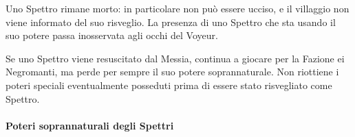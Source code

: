 \documentclass[a4paper,10pt]{article}
\begin{document}
\begin{itemize}
 Uno Spettro rimane morto: in particolare non può essere ucciso, e il villaggio non viene informato del suo risveglio.
 La presenza di uno Spettro che sta usando il suo potere passa inosservata agli occhi del Voyeur.
 
 Se uno Spettro viene resuscitato dal Messia, continua a giocare per la Fazione ei Negromanti, ma perde per sempre il suo potere soprannaturale. 
 Non riottiene i poteri speciali eventualmente posseduti prima di essere stato risvegliato come Spettro.
 
\end{itemize}


\paragraph{Poteri soprannaturali degli Spettri}
\end{document}

